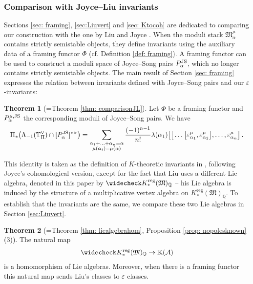 \documentclass[12pt]{amsart}
\theoremstyle{definition}
\newtheorem{thm}{Theorem}
\newcommand{\BK}{{\mathbb{K}}}
\newcommand{\BQ}{{\mathbb{Q}}}
\newcommand{\BT}{{\mathbb{T}}}
\newcommand{\CA}{{\mathcal A}}
\newcommand{\1}{\mathbf 1}
\newcommand{\FM}{{\mathfrak{M}}}
\newcommand{\vir}{\mathrm{vir}}
\newcommand{\reg}{\mathrm{reg}}
\begin{document}
\subsubsection{Comparison with Joyce--Liu invariants}

Sections \ref{sec: framing}, \ref{sec:Liuvert} and \ref{sec: Ktocoh} are dedicated to comparing our construction with the one by Liu \cite{Liu} and Joyce \cite{joyce}. When the moduli stack $\FM_\alpha^\mu$ contains strictly semistable objects, they define invariants using the auxiliary data of a framing functor $\Phi$ (cf. Definition \ref{def: framing}). A framing functor can be used to construct a moduli space of Joyce--Song pairs $P_\alpha^{\textup{JS}}$, which no longer contains strictly semistable objects. The main result of Section \ref{sec: framing} expresses the relation between invariants defined with Joyce--Song pairs and our $\varepsilon$-invariants:

\begin{thm}[=Theorem \ref{thm: comparisonJL}]
Let $\Phi$ be a framing functor and $P_\alpha^{\mu, \textup{JS}}$ the corresponding moduli of Joyce--Song pairs. We have
    \begin{equation*}
        \Pi_\ast\big(\Lambda_{-1}(\BT_\Pi^\vee)\cap [P_\alpha^{ \textup{JS}}]^\vir\big)=\sum_{\substack{\alpha_{1}+\ldots+\alpha_n=\alpha\\
        \mu(\alpha_i)=\mu(\alpha)}}\frac{(-1)^{n-1}}{n!}\lambda(\alpha_1)\big[\big[\ldots\big[\varepsilon_{\alpha_1}^\mu,\varepsilon_{\alpha_2}^\mu\big],\ldots, \varepsilon_{\alpha_n}^\mu\big]\,. 
    \end{equation*}
\end{thm}
This identity is taken as the definition of $K$-theoretic invariants in \cite{Liu}, following Joyce's cohomological version, except for the fact that Liu uses a different Lie algebra, denoted in this paper by $\widecheck K_\ast^\reg(\FM)_\BQ$ -- his Lie algebra is induced by the structure of a multiplicative vertex algebra on $K_\ast^\reg(\FM)_\BQ$. To establish that the invariants are the same, we compare these two Lie algebras in Section \ref{sec:Liuvert}.

\begin{thm}[=Theorem \ref{thm: liealgebrahom}, Proposition \ref{prop: nopolesknown}(3)]
    The natural map
    \[\widecheck K_\ast^\reg(\FM)_\BQ\to \BK(\CA)\]
    is a homomorphism of Lie algebras. Moreover, when there is a framing functor this natural map sends Liu's classes to $\varepsilon$ classes. 
\end{thm}
\end{document}
